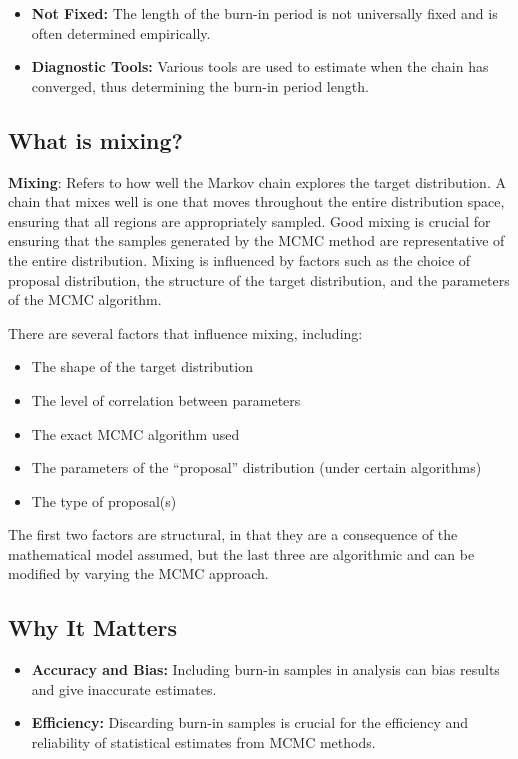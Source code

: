 \documentclass{article}
\begin{document}
\begin{itemize}
    \item \textbf{Not Fixed:} The length of the burn-in period is not universally fixed and is often determined empirically.
    \item \textbf{Diagnostic Tools:} Various tools are used to estimate when the chain has converged, thus determining the burn-in period length.
\end{itemize}

\subsection{What is  mixing?}
\textbf{Mixing}: Refers to how well the Markov chain explores the target distribution. A chain that mixes well is one that moves throughout the entire distribution space, ensuring that all regions are appropriately sampled. Good mixing is crucial for ensuring that the samples generated by the MCMC method are representative of the entire distribution. Mixing is influenced by factors such as the choice of proposal distribution, the structure of the target distribution, and the parameters of the MCMC algorithm.


There are several factors that influence mixing, including:

\begin{itemize}
    \item The shape of the target distribution
    \item The level of correlation between parameters
    \item The exact MCMC algorithm used
    \item The parameters of the “proposal” distribution (under certain algorithms)
    \item The type of proposal(s)
\end{itemize}
The first two factors are structural, in that they are a consequence of the mathematical model assumed, but the last three are algorithmic and can be modified by varying the MCMC approach.

\subsection{Why It Matters}

\begin{itemize}
    \item \textbf{Accuracy and Bias:} Including burn-in samples in analysis can bias results and give inaccurate estimates.
    \item \textbf{Efficiency:} Discarding burn-in samples is crucial for the efficiency and reliability of statistical estimates from MCMC methods.
\end{itemize}
\end{document}
